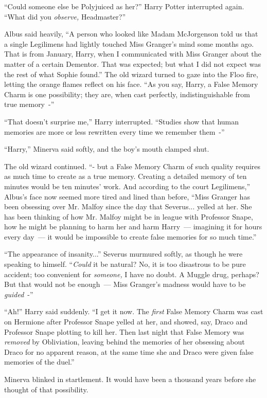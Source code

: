 ``Could someone else be Polyjuiced as her?'' Harry Potter interrupted again. ``What did you \emph{observe,} Headmaster?''

Albus said heavily, ``A person who looked like Madam McJorgenson told us that a single Legilimens had lightly touched Miss Granger's mind some months ago. That is from January, Harry, when I communicated with Miss Granger about the matter of a certain Dementor. That was expected; but what I did not expect was the rest of what Sophie found.'' The old wizard turned to gaze into the Floo fire, letting the orange flames reflect on his face. ``As you say, Harry, a False Memory Charm is one possibility; they are, when cast perfectly, indistinguishable from true memory~-''

``That doesn't surprise me,'' Harry interrupted. ``Studies show that human memories are more or less rewritten every time we remember them~-''

``Harry,'' Minerva said softly, and the boy's mouth clamped shut.

The old wizard continued. ``- but a False Memory Charm of such quality requires as much time to create as a true memory. Creating a detailed memory of ten minutes would be ten minutes' work. And according to the court Legilimens,'' Albus's face now seemed more tired and lined than before, ``Miss Granger has been obsessing over Mr. Malfoy since the day that Severus... yelled at her. She has been thinking of how Mr. Malfoy might be in league with Professor Snape, how he might be planning to harm her and harm Harry~--- imagining it for hours every day~--- it would be impossible to create false memories for so much time.''

``The appearance of insanity...'' Severus murmured softly, as though he were speaking to himself. ``\emph{Could} it be natural? No, it is too disastrous to be pure accident; too convenient for \emph{someone,} I have no doubt. A Muggle drug, perhaps? But that would not be enough~--- Miss Granger's madness would have to be \emph{guided}~-''

``Ah!'' Harry said suddenly. ``I get it now. The \emph{first} False Memory Charm was cast on Hermione after Professor Snape yelled at her, and showed, say, Draco and Professor Snape plotting to kill her. Then last night that False Memory was \emph{removed} by Obliviation, leaving behind the memories of her obsessing about Draco for no apparent reason, at the same time she and Draco were given false memories of the duel.''

Minerva blinked in startlement. It would have been a thousand years before she thought of that possibility.


